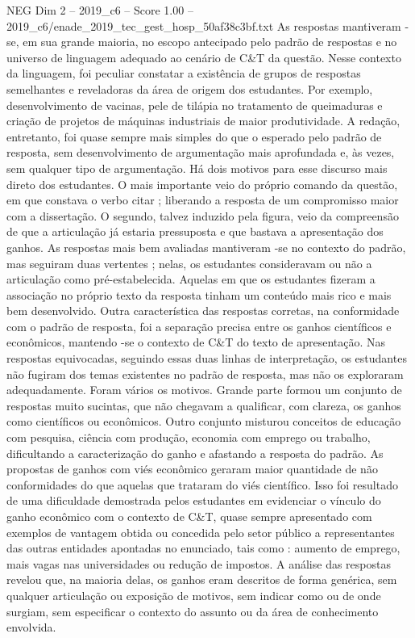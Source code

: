 \begin{textsample}{NEG Dim 2 – 2019\_c6 – Score 1.00 – 2019\_c6/enade\_2019\_tec\_gest\_hosp\_50af38c3bf.txt}
As respostas mantiveram -se, em sua grande maioria, no escopo antecipado pelo padrão de respostas e no universo de linguagem adequado ao cenário de C\&T da questão.
Nesse contexto da linguagem, foi peculiar constatar a existência de grupos de respostas semelhantes e reveladoras da área de origem dos estudantes.
Por exemplo, desenvolvimento de vacinas, pele de tilápia no tratamento de queimaduras e criação de projetos de máquinas industriais de maior produtividade.
A redação, entretanto, foi quase sempre mais simples do que o esperado pelo padrão de resposta, sem desenvolvimento de argumentação mais aprofundada e, às vezes, sem qualquer tipo de argumentação.
Há dois motivos para esse discurso mais direto dos estudantes.
O mais importante veio do próprio comando da questão, em que constava o verbo citar ; liberando a resposta de um compromisso maior com a dissertação.
O segundo, talvez induzido pela figura, veio da compreensão de que a articulação já estaria pressuposta e que bastava a apresentação dos ganhos.
As respostas mais bem avaliadas mantiveram -se no contexto do padrão, mas seguiram duas vertentes ; nelas, os estudantes consideravam ou não a articulação como pré-estabelecida.
Aquelas em que os estudantes fizeram a associação no próprio texto da resposta tinham um conteúdo mais rico e mais bem desenvolvido.
Outra característica das respostas corretas, na conformidade com o padrão de resposta, foi a separação precisa entre os ganhos científicos e econômicos, mantendo -se o contexto de C\&T do texto de apresentação.
Nas respostas equivocadas, seguindo essas duas linhas de interpretação, os estudantes não fugiram dos temas existentes no padrão de resposta, mas não os exploraram adequadamente.
Foram vários os motivos.
Grande parte formou um conjunto de respostas muito sucintas, que não chegavam a qualificar, com clareza, os ganhos como científicos ou econômicos.
Outro conjunto misturou conceitos de educação com pesquisa, ciência com produção, economia com emprego ou trabalho, dificultando a caracterização do ganho e afastando a resposta do padrão.
As propostas de ganhos com viés econômico geraram maior quantidade de não conformidades do que aquelas que trataram do viés científico.
Isso foi resultado de uma dificuldade demostrada pelos estudantes em evidenciar o vínculo do ganho econômico com o contexto de C\&T, quase sempre apresentado com exemplos de vantagem obtida ou concedida pelo setor público a representantes das outras entidades apontadas no enunciado, tais como : aumento de emprego, mais vagas nas universidades ou redução de impostos.
A análise das respostas revelou que, na maioria delas, os ganhos eram descritos de forma genérica, sem qualquer articulação ou exposição de motivos, sem indicar como ou de onde surgiam, sem especificar o contexto do assunto ou da área de conhecimento envolvida.

\end{textsample}
